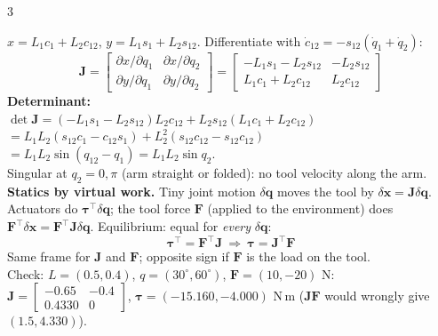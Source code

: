 \begin{multicols}{3}
\begin{fbx}[(h) 2R Jacobian, $\det\mathbf J$, and $\boldsymbol\tau=\mathbf J^\top\mathbf F$]
$x=L_1c_1+L_2c_{12}$, $y=L_1s_1+L_2s_{12}$. Differentiate with $\dot c_{12}=-s_{12}(\dot q_1+\dot q_2)$:
\[\mathbf J=\begin{bmatrix}\partial x/\partial q_1&\partial x/\partial q_2\\\partial y/\partial q_1&\partial y/\partial q_2\end{bmatrix}=\begin{bmatrix}-L_1s_1-L_2s_{12}&-L_2s_{12}\\L_1c_1+L_2c_{12}&L_2c_{12}\end{bmatrix}\]
\textbf{Determinant:}\\
$\det\mathbf J=(-L_1s_1-L_2s_{12})L_2c_{12}+L_2s_{12}(L_1c_1+L_2c_{12})$\\
$=L_1L_2(s_{12}c_1-c_{12}s_1)+L_2^2(s_{12}c_{12}-s_{12}c_{12})$\\
$=L_1L_2\sin(q_{12}-q_1)=L_1L_2\sin q_2.$\\
Singular at $q_2=0,\pi$ (arm straight or folded): no tool velocity along the arm.\\
\textbf{Statics by virtual work.} Tiny joint motion $\delta\mathbf q$ moves the tool by $\delta\mathbf x=\mathbf J\delta\mathbf q$. Actuators do $\boldsymbol\tau^\top\delta\mathbf q$; the tool force $\mathbf F$ (applied to the environment) does $\mathbf F^\top\delta\mathbf x=\mathbf F^\top\mathbf J\delta\mathbf q$. Equilibrium: equal for \emph{every} $\delta\mathbf q$:
\[\boldsymbol\tau^\top=\mathbf F^\top\mathbf J\ \Rightarrow\ \boldsymbol\tau=\mathbf J^\top\mathbf F\]
Same frame for $\mathbf J$ and $\mathbf F$; opposite sign if $\mathbf F$ is the load on the tool.\\
Check: $L=(0.5,0.4)$, $q=(30^\circ,60^\circ)$, $\mathbf F=(10,-20)$ N: $\mathbf J=\begin{bmatrix}-0.65&-0.4\\0.4330&0\end{bmatrix}$, $\boldsymbol\tau=(-15.160,-4.000)$ N\,m ($\mathbf J\mathbf F$ would wrongly give $(1.5,4.330)$). \chk
\end{fbx}


\end{multicols}
